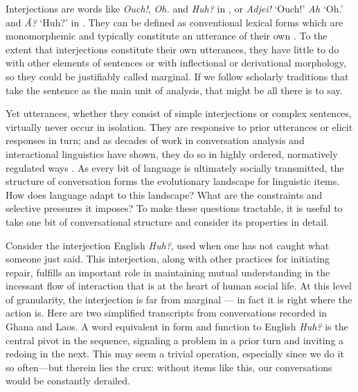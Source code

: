 \documentclass[output=paper]{langsci/langscibook}
\begin{document}
 Interjections are words like \textit{Ouch!}, \textit{Oh.} and \textit{Huh?} in , or \textit{Adjei!} ‘Ouch!’ \textit{Ah} ‘Oh.’ and \textit{Ã?} ‘Huh?’ in . They can be defined as conventional lexical forms which are monomorphemic and typically constitute an utterance of their own \citep{Wilkins1992}. To the extent that interjections constitute their own utterances, they have little to do with other elements of sentences or with inflectional or derivational morphology, so they could be justifiably called marginal. If we follow scholarly traditions that take the sentence as the main unit of analysis, that might be all there is to say. 


  Yet utterances, whether they consist of simple interjections or complex sentences, virtually never occur in isolation. They are responsive to prior utterances or elicit responses in turn; and as decades of work in conversation analysis and interactional linguistics have shown, they do so in highly ordered, normatively regulated ways \citep{Schegloff2007,Selting2001}. As every bit of language is ultimately socially transmitted,  the structure of conversation forms the evolutionary landscape for linguistic items. How does language adapt to this landscape? What are the constraints and selective pressures it imposes? To make these questions tractable, it is useful to take one bit of conversational structure and consider its properties in detail. 



 Consider the interjection English \textit{Huh?}, used when one has not caught what someone just said. This interjection, along with other practices for initiating repair,  fulfills an important role in maintaining mutual understanding in the incessant flow of interaction that is at the heart of human social life. At this level of granularity, the interjection is far from marginal — in fact it is right where the action is. Here are two simplified transcripts from conversations recorded in Ghana and Laos. A word equivalent in form and function to English \textit{Huh?} is the central pivot in the sequence, signaling a problem in a prior turn and inviting a redoing in the next. This may seem a trivial operation, especially since we do it so often---but therein lies the crux: without items like this, our conversations would be constantly derailed.
\end{document}
